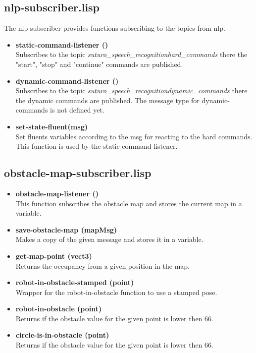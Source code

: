 \documentclass[main.tex]{subfiles}
\begin{document}
		\subsection{nlp-subscriber.lisp}
		The nlp-subscriber provides functions subscribing to the topics from nlp.
		\begin{itemize}
		   \item \textbf{static-command-listener ()} \\
		   Subscribes to the topic \textit{suturo\_speech\_recognition\/hard\_commands} there the "start", "stop" and "continue" commands are published.
		   \item \textbf{dynamic-command-listener ()} \\
		   Subscribes to the topic \textit{suturo\_speech\_recognition\/dynamic\_commands} there the dynamic commands are published. The message type for dynamic-commands is not defined yet.
		   \item \textbf{set-state-fluent(msg)} \\
		   Set fluents variables according to the msg for reacting to the hard commands. This function is used by the static-command-listener.
		 \end{itemize}
		\subsection{obstacle-map-subscriber.lisp}
	    \begin{itemize}
	    	\item \textbf{obstacle-map-listener ()} \\
	    	This function subscribes the obstacle map and stores the current map in a variable.
	    	\item \textbf{save-obstacle-map (mapMsg)} \\
	    	Makes a copy of the given message and stores it in a variable.
	    	\item \textbf{get-map-point (vect3)} \\
	    	Returns the occupancy from a given position in the map.
	    	\item \textbf{robot-in-obstacle-stamped (point)} \\
	    	Wrapper for the robot-in-obstacle function to use a stamped pose.
	    	\item \textbf{robot-in-obstacle (point)} \\
	    	Returns if the obstacle value for the given point is lower then 66.
	    	\item \textbf{circle-is-in-obstacle (point)} \\
	    	Returns if the obstacle value for the given point is lower then 66.
	    \end{itemize}
\end{document}
